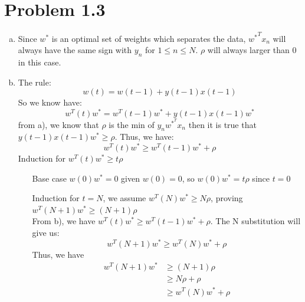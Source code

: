\documentclass{article}
\def\math#1{$#1$}
\begin{document}
\section{Problem 1.3}
\begin{enumerate}[a)]
    \item Since \math{w^*} is an optimal set of weights which separates the data, \math{{w^*}^T x_n} will always have the same sign with \math{y_n} for \math{1 \leq n \leq N}. \math{\rho} will always larger than 0 in this case.
    \item The rule: 
        \begin{equation}
            w(t) = w(t - 1) + y(t - 1)x(t - 1)
        \end{equation}
        So we know have:
        \begin{equation}
            w^T(t)w^* = w^T(t - 1)w^* + y(t - 1)x(t - 1)w^*
        \end{equation}
        from a), we know that \math{\rho} is the min of \math{y_n w^{*^T} x_n} then it is true that \math{y(t - 1)x(t - 1)w^* \geq \rho}.
        Thus, we have:
        \begin{equation}
            w^T(t)w^* \geq w^T (t - 1) w^* + \rho
        \end{equation}
        Induction for \math{w^T(t)w^* \geq t \rho}
        \begin{itemize}
            \item [Base case] \math{w(0)w^* = 0} given \math{w(0) = 0}, so \math{w(0)w^* = t\rho} since \math{t = 0}
            \item [Induction] for \math{t = N}, we assume \math{w^T(N)w^* \geq N\rho}, proving \math{w^T(N + 1)w^* \geq (N + 1)\rho} \\
            From b), we have \math{w^T(t)w^* \geq w^T (t - 1) w^* + \rho}. The N substitution will give us:
            \begin{equation}
                w^T(N + 1) w^* \geq w^T(N) w^* + \rho
            \end{equation}
            Thus, we have 
            \begin{equation}
                \begin{split}
                    w^T(N + 1) w^* &\geq (N+1) \rho \\
                    &\geq N\rho + \rho \\
                    &\geq w^T(N)w^* + \rho
                \end{split}
            \end{equation}

\end{itemize}
\end{enumerate}
\end{document}
